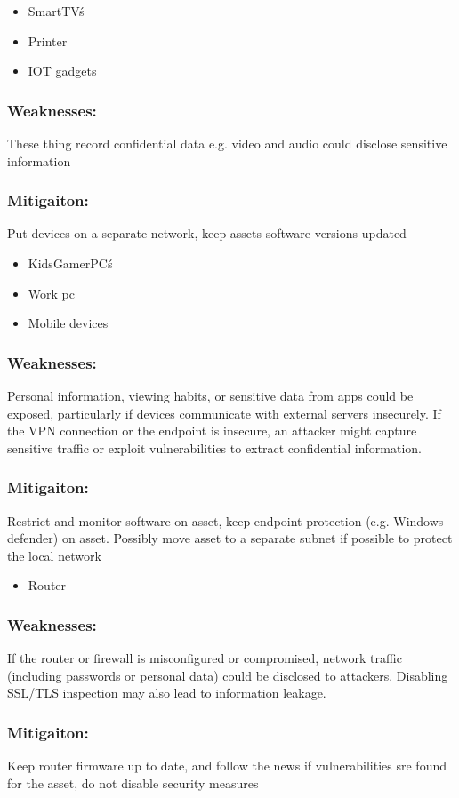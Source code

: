 \documentclass[
	letterpaper, %
	10pt, %
	unnumberedsections, %
	twoside, %
]{APAAssignment}
\begin{document}
\begin{singlespace}

	\begin{itemize}
		\item SmartTV\'s
		\item Printer 
		\item IOT gadgets 
	\end{itemize}
	
	\subsubsection{Weaknesses:} These thing record confidential data e.g. video and audio could disclose sensitive information  
	\subsubsection{Mitigaiton:} Put devices on a separate network, keep assets software versions updated
	
	\begin{itemize}
		\item KidsGamerPC\'s
		\item Work pc
		\item Mobile devices
	\end{itemize}
	
	\subsubsection{Weaknesses:} Personal information, viewing habits, or sensitive data from apps could be exposed, particularly if devices communicate with external servers insecurely. If the VPN connection or the endpoint is insecure, an attacker might capture sensitive traffic or exploit vulnerabilities to extract confidential information.

	\subsubsection{Mitigaiton:} Restrict and monitor software on asset, keep endpoint protection (e.g. Windows defender) on asset. Possibly move asset to a separate subnet if possible to protect the local network

	\begin{itemize}
		\item Router
	\end{itemize}
	
	\subsubsection{Weaknesses:} If the router or firewall is misconfigured or compromised, network traffic (including passwords or personal data) could be disclosed to attackers. Disabling SSL/TLS inspection may also lead to information leakage.
	\subsubsection{Mitigaiton:} Keep router firmware up to date, and follow the news if vulnerabilities sre found for the asset, do not disable security measures
	
	
\end{singlespace}
\end{document}
